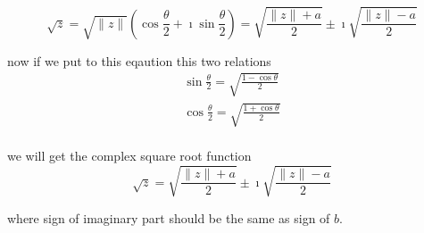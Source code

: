 \documentclass[11pt,a4paper,openany,oneside]{extreport}
\begin{document}
\begin{displaymath}
	\sqrt{z} = \sqrt{\|z\|}\left( \cos\frac{\theta}{2}+\imath \sin\frac{\theta}{2}\right ) =\sqrt{ \frac{\|z\| + a}{2} } \pm \imath \sqrt{ \frac{ \|z\| - a}{2} }
\end{displaymath}

now if we put to this eqaution this two relations
\begin{displaymath}
 \begin{array}{l}
 \sin \frac{\theta}{2} = \sqrt{ \frac{1-\cos \theta }{2} } \\
 \cos \frac{\theta}{2} = \sqrt{ \frac{1+\cos \theta }{2} } \\
 \end{array}
\end{displaymath}

we will get the complex square root function
\begin{displaymath}
	\sqrt{z} =\sqrt{ \frac{\|z\| + a}{2} } \pm \imath \sqrt{ \frac{ \|z\| - a}{2} }
\end{displaymath}

where sign of imaginary part should be the same as sign of $b$.

 
\end{document}
